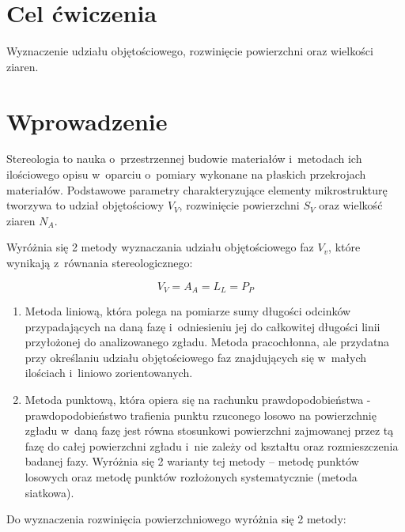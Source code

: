 \documentclass[a4paper,12pt]{article}
\begin{document}
    



\section{Cel ćwiczenia}

Wyznaczenie udziału objętościowego, rozwinięcie powierzchni oraz wielkości ziaren.

\section{Wprowadzenie}

Stereologia to nauka o~przestrzennej budowie materiałów i~metodach ich ilościowego opisu w~oparciu o~pomiary wykonane na płaskich przekrojach materiałów. Podstawowe parametry charakteryzujące elementy mikrostrukturę tworzywa to udział objętościowy $V_V$, rozwinięcie powierzchni $S_V$ oraz wielkość ziaren $N_A$.

Wyróżnia się 2 metody wyznaczania udziału objętościowego faz $V_v$, które wynikają z~równania stereologicznego:

$$V_V=A_A=L_L=P_P$$

\begin{enumerate}
    \item Metoda liniową, która polega na pomiarze sumy długości  odcinków przypadających na daną fazę i~odniesieniu jej do całkowitej długości linii przyłożonej do analizowanego zgładu. Metoda pracochłonna, ale przydatna przy określaniu udziału objętościowego faz znajdujących się w~małych ilościach i~liniowo zorientowanych. 
    \item Metoda punktową, która opiera się na rachunku prawdopodobieństwa - prawdopodobieństwo trafienia punktu rzuconego losowo na powierzchnię zgładu w~daną fazę jest równa stosunkowi powierzchni zajmowanej przez tą fazę do całej powierzchni zgładu i~nie zależy od kształtu oraz rozmieszczenia badanej fazy. Wyróżnia się 2 warianty tej metody – metodę punktów losowych oraz metodę punktów rozłożonych systematycznie (metoda siatkowa).
\end{enumerate}

\newpage

Do wyznaczenia rozwinięcia powierzchniowego wyróżnia się 2 metody:
\end{document}
